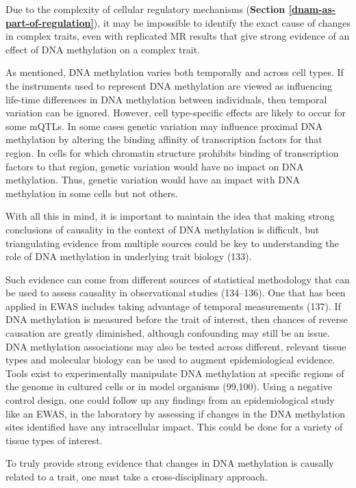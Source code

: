 \documentclass[11pt,twoside]{bristolthesis}
\begin{document}
Due to the complexity of cellular regulatory mechanisms (\textbf{Section \ref{dnam-as-part-of-regulation}}), it may be impossible to identify the exact cause of changes in complex traits, even with replicated MR results that give strong evidence of an effect of DNA methylation on a complex trait.

As mentioned, DNA methylation varies both temporally and across cell types. If the instruments used to represent DNA methylation are viewed as influencing life-time differences in DNA methylation between individuals, then temporal variation can be ignored. However, cell type-specific effects are likely to occur for some mQTLs. In some cases genetic variation may influence proximal DNA methylation by altering the binding affinity of transcription factors for that region. In cells for which chromatin structure prohibits binding of transcription factors to that region, genetic variation would have no impact on DNA methylation. Thus, genetic variation would have an impact with DNA methylation in some cells but not others.

With all this in mind, it is important to maintain the idea that making strong conclusions of causality in the context of DNA methylation is difficult, but triangulating evidence from multiple sources could be key to understanding the role of DNA methylation in underlying trait biology (133).

Such evidence can come from different sources of statistical methodology that can be used to assess causality in observational studies (134--136). One that has been applied in EWAS includes taking advantage of temporal measurements (137). If DNA methylation is measured before the trait of interest, then chances of reverse causation are greatly diminished, although confounding may still be an issue. DNA methylation associations may also be tested across different, relevant tissue types and molecular biology can be used to augment epidemiological evidence. Tools exist to experimentally manipulate DNA methylation at specific regions of the genome in cultured cells or in model organisms (99,100). Using a negative control design, one could follow up any findings from an epidemiological study like an EWAS, in the laboratory by assessing if changes in the DNA methylation sites identified have any intracellular impact. This could be done for a variety of tissue types of interest.

To truly provide strong evidence that changes in DNA methylation is causally related to a trait, one must take a cross-disciplinary approach.
\end{document}
